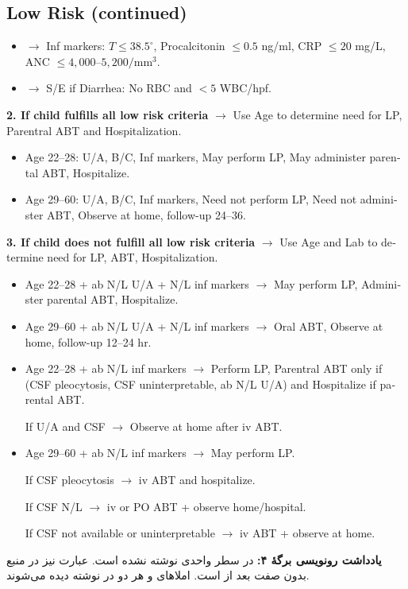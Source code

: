 \documentclass[12pt,a4paper]{article}
\begin{document}
\begin{latin}
\subsection*{Low Risk (continued)}
\begin{itemize}
\item \(\longrightarrow\) Inf markers: \(T\leq38.5^\circ\), Procalcitonin \(\leq0.5\) ng/ml,
  CRP \(\leq20\) mg/L, ANC \(\leq4{,}000\text{--}5{,}200/\mathrm{mm}^3\).
\item \(\longrightarrow\) S/E if Diarrhea: No RBC and \(<5\) WBC/hpf.
\end{itemize}

\textbf{2. If child fulfills all low risk criteria}
\(\longrightarrow\) Use Age to determine need for LP, Parentral ABT and Hospitalization.
\begin{itemize}
\item Age 22--28: U/A, B/C, Inf markers, May perform LP, May administer parental ABT, Hospitalize.
\item Age 29--60: U/A, B/C, Inf markers, Need not perform LP,
  Need not administer ABT, Observe at home, follow-up 24--36.
\end{itemize}

\textbf{3. If child does not fulfill all low risk criteria}
\(\longrightarrow\) Use Age and Lab to determine need for LP, ABT, Hospitalization.
\begin{itemize}
\item Age 22--28 + ab N/L U/A + N/L inf markers
  \(\longrightarrow\) May perform LP, Administer parental ABT, Hospitalize.
\item Age 29--60 + ab N/L U/A + N/L inf markers
  \(\longrightarrow\) Oral ABT, Observe at home, follow-up 12--24 hr.
\item Age 22--28 + ab N/L inf markers
  \(\longrightarrow\) Perform LP, Parentral ABT only if (CSF pleocytosis, CSF uninterpretable, ab N/L U/A)
  and Hospitalize if parental ABT.
  \par If U/A and CSF \(\longrightarrow\) Observe at home after iv ABT.
\item Age 29--60 + ab N/L inf markers
  \(\longrightarrow\) May perform LP.
  \par If CSF pleocytosis \(\longrightarrow\) iv ABT and hospitalize.
  \par If CSF N/L \(\longrightarrow\) iv or PO ABT + observe home/hospital.
  \par If CSF not available or uninterpretable \(\longrightarrow\) iv ABT + observe at home.
\end{itemize}
\end{latin}
\textbf{یادداشت رونویسی برگهٔ ۴:} در سطر  واحدی نوشته نشده است. عبارت  نیز در منبع بدون صفت بعد از  است. املاهای  و  هر دو در نوشته دیده می‌شوند.
\end{document}
